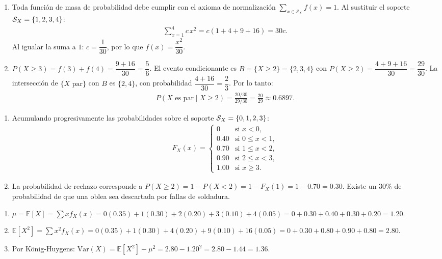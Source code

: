 \begin{solproblema}[prob:2c27c8e]
	\begin{enumerate}
		\item Toda función de masa de probabilidad debe cumplir con el axioma de normalización $\sum_{x \in \mathcal{S}_X} f(x) = 1$. Al sustituir el soporte $\mathcal{S}_X = \left\{ 1, 2, 3, 4 \right\}$:
		\begin{align*}
			\sum_{x=1}^{4} c\, x^2 = c(1 + 4 + 9 + 16) = 30c.
		\end{align*}
		Al igualar la suma a $1$: $c = \dfrac{1}{30}$, por lo que $f(x) = \dfrac{x^2}{30}$.
		\item $P(X \ge 3) = f(3) + f(4) = \dfrac{9+16}{30} = \dfrac{5}{6}$. El evento condicionante es $B=\{X\ge2\}=\{2,3,4\}$ con $P(X\ge2)=\dfrac{4+9+16}{30}=\dfrac{29}{30}$. La intersección de $\{X \text{ par}\}$ con $B$ es $\{2,4\}$, con probabilidad $\dfrac{4+16}{30}=\dfrac{2}{3}$. Por lo tanto:
		\begin{align*}
			P(X \text{ es par} \mid X \ge 2) = \frac{20/30}{29/30} = \frac{20}{29} \approx 0.6897.
		\end{align*}
	\end{enumerate}
\end{solproblema}

\begin{solproblema}
	\begin{enumerate}
		\item Acumulando progresivamente las probabilidades sobre el soporte $\mathcal{S}_X = \left\{ 0,1,2,3 \right\}$:
		\begin{align*}
			F_X(x) = \begin{cases}
				0 & \text{si } x < 0, \\
				0.40 & \text{si } 0 \le x < 1, \\
				0.70 & \text{si } 1 \le x < 2, \\
				0.90 & \text{si } 2 \le x < 3, \\
				1.00 & \text{si } x \ge 3.
			\end{cases}
		\end{align*}
		\item La probabilidad de rechazo corresponde a $P(X \ge 2) = 1 - P(X < 2) = 1 - F_X(1) = 1 - 0.70 = 0.30$. Existe un $30\%$ de probabilidad de que una oblea sea descartada por fallas de soldadura.
	\end{enumerate}
\end{solproblema}

\begin{solproblema}[prob:c324c4f]
	\begin{enumerate}
		\item $\mu = \mathbb{E}[X] = \sum x f_X(x) = 0(0.35)+1(0.30)+2(0.20)+3(0.10)+4(0.05) = 0+0.30+0.40+0.30+0.20 = 1.20$.
		\item $\mathbb{E}[X^2] = \sum x^2 f_X(x) = 0(0.35)+1(0.30)+4(0.20)+9(0.10)+16(0.05) = 0+0.30+0.80+0.90+0.80 = 2.80$.
		\item Por König-Huygens: $\text{Var}(X) = \mathbb{E}[X^2] - \mu^2 = 2.80 - 1.20^2 = 2.80 - 1.44 = 1.36$.
	\end{enumerate}
\end{solproblema}

